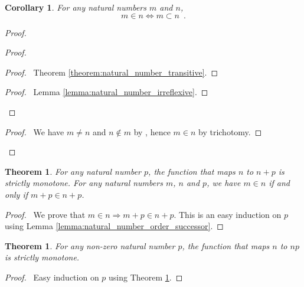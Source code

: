 \documentclass{article}
\let\qed\relax
\newtheorem{theorem}[axiom]{Theorem}
\newtheorem{corollary}{Corollary}[axiom]
\theoremstyle{definition}
\begin{document}
    \begin{corollary}
        For any natural numbers $m$ and $n$,
        \[ m \in n \Leftrightarrow m \subset n \enspace . \]
    \end{corollary}

    \begin{proof}
        \pf
        \begin{proof}
            \begin{proof}
                \pf\ Theorem \ref{theorem:natural_number_transitive}.
            \end{proof}
            \begin{proof}
                \pf\ Lemma \ref{lemma:natural_number_irreflexive}.
            \end{proof}
        \end{proof}
        \begin{proof}
            \pf\ We have $m \neq n$ and $n \notin m$ by , hence $m \in n$ by trichotomy.
        \end{proof}
        \qed
    \end{proof}

    \begin{theorem}
        \label{theorem:addition_strictly_monotone}
        For any natural number $p$, the function that maps $n$ to $n + p$ is strictly monotone.
        For any natural numbers $m$, $n$ and $p$, we have $m \in n$ if and only if $m + p \in n + p$.
    \end{theorem}

    \begin{proof}
        \pf\ We prove that $m \in n \Rightarrow m + p \in n + p$. This is an easy induction on $p$ using
        Lemma \ref{lemma:natural_number_order_successor}. \qed
    \end{proof}

    \begin{theorem}
        For any non-zero natural number $p$, the function that maps $n$ to $np$ is strictly monotone.
    \end{theorem}

    \begin{proof}
        \pf\ Easy induction on $p$ using Theorem \ref{theorem:addition_strictly_monotone}. \qed
    \end{proof}
\end{document}
